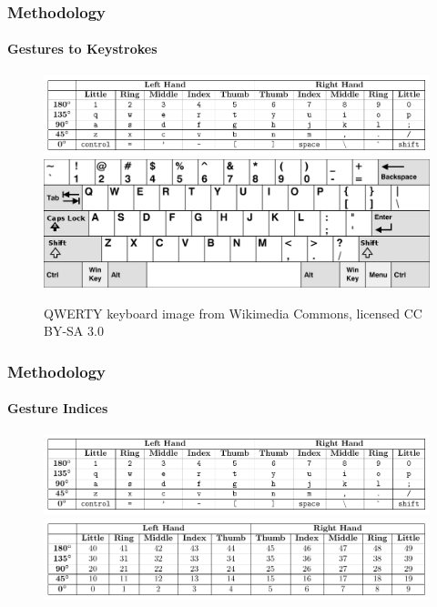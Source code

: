 \documentclass[xcolor={svgnames,table},10pt,fleqn]{beamer}
\begin{document}
\begin{frame}
    \frametitle{Methodology}
    \framesubtitle{Gestures to Keystrokes}
    \begin{figure}[h]
        \centering
        \includegraphics[width=\textwidth]{gesture_to_keystrokes.pdf}
        \includegraphics[width=\textwidth]{qwerty_keyboard.png}
        \caption{QWERTY keyboard image from Wikimedia Commons, licensed CC BY-SA 3.0}
    \end{figure}
\end{frame}

\begin{frame}
    \frametitle{Methodology}
    \framesubtitle{Gesture Indices}
    \begin{figure}[h]
        \centering
        \includegraphics[width=\textwidth]{gesture_to_keystrokes.pdf}
        \includegraphics[width=\textwidth]{gesture_to_indices.pdf}
    \end{figure}
\end{frame}
\end{document}
